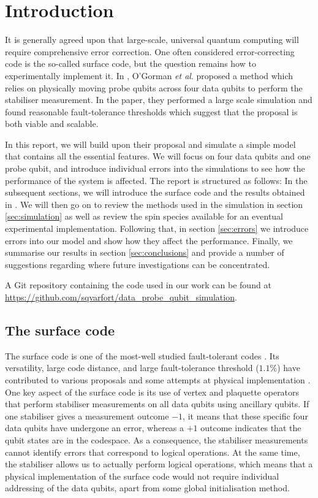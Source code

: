 \section{Introduction} \label{sec:introduction}

It is generally agreed upon that large-scale, universal quantum computing will require comprehensive error correction. One often considered error-correcting code is the so-called surface code, but the question remains how to experimentally implement it. In \cite{OGorman2016}, O'Gorman \textit{et al}. proposed a method which relies on physically moving probe qubits across four data qubits to perform the stabiliser measurement. In the paper, they performed a large scale simulation and found reasonable fault-tolerance thresholds which suggest that the proposal is both viable and scalable. 

In this report, we will build upon their proposal and simulate a simple model that contains all the essential features. We will focus on four data qubits and one probe qubit, and introduce individual errors into the simulations to see how the performance of the system is affected. The report is structured as follows: In the subsequent sections, we will introduce the surface code and the results obtained in \citet{OGorman2016}. We will then go on to review the methods used in the simulation in section \@ \ref{sec:simulation} as well as review the spin species available for an eventual experimental implementation. Following that, in section \@ \ref{sec:errors} we introduce errors into our model and show how they affect the performance. Finally, we summarise our results in section \@ \ref{sec:conclusions} and provide a number of suggestions regarding where future investigations can be concentrated. 

A Git repository containing the code used in our work can be found at \url{https://github.com/sqvarfort/data_probe_qubit_simulation}. 

\subsection{The surface code}
The surface code is one of the most-well studied fault-tolerant codes \cite{Wang2011,Fowler2012}. Its versatility, large code distance, and large fault-tolerance threshold ($1.1\%$) have contributed to various proposals \cite{Fowler2012,Pica2014,Tosi2015,Hill2015,OGorman2016} and some attempts at physical implementation \cite{Barends2014,Kelly2015}. One key aspect of the surface code is its use of vertex and plaquette operators that perform stabiliser measurements on all data qubits using ancillary qubits. If one stabiliser gives a measurement outcome $-1$, it means that these specific four data qubits have undergone an error, whereas a $+1$ outcome indicates that the qubit states are in the codespace. As a consequence, the stabiliser measurements cannot identify errors that correspond to logical operations. At the same time, the stabiliser allows us to actually perform logical operations, which means that a physical implementation of the surface code would not require individual addressing of the data qubits, apart from some global initialisation method. 

